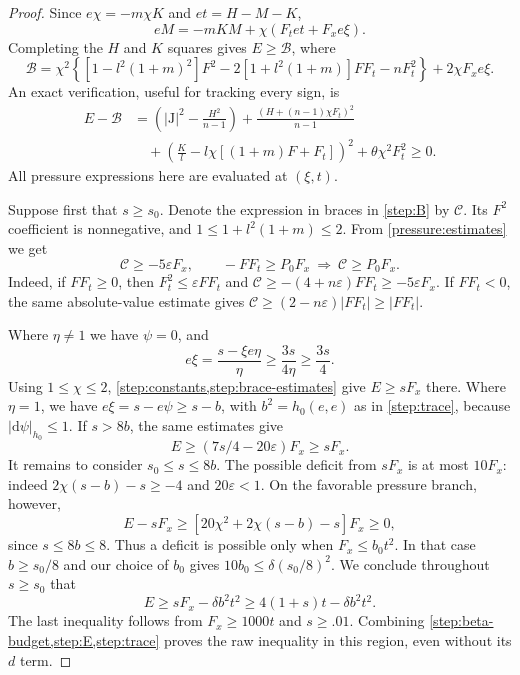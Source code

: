 \documentclass[11pt]{article}
\numberwithin{equation}{section}
\theoremstyle{definition}
\theoremstyle{remark}
\begin{document}
\begin{proof}
Since $e\chi=-m\chi K$ and $et=H-M-K$,
\[
 eM=-mKM+\chi(F_t et+F_xe\xi).
\]
Completing the $H$ and $K$ squares gives $E\ge\mathcal B$, where
\begin{equation}\label{step:B}
 \mathcal B=\chi^2\left\{
 [1-l^2(1+m)^2]F^2
 -2[1+l^2(1+m)]FF_t-nF_t^2\right\}
 +2\chi F_xe\xi.
\end{equation}
An exact verification, useful for tracking every sign, is
\begin{align*}
 E-\mathcal B
 &=\left(|\mathrm J|^2-\frac{H^2}{n-1}\right)
 +\frac{(H+(n-1)\chi F_t)^2}{n-1}\\
 &\quad+\left(\frac K l-l\chi[(1+m)F+F_t]\right)^2
 +\theta\chi^2F_t^2\ge0.
\end{align*}
All pressure expressions here are evaluated at $(\xi,t)$.

Suppose first that $s\ge s_0$.  Denote the expression in braces in
\cref{step:B} by $\mathcal C$.  Its $F^2$ coefficient is nonnegative,
and $1\le1+l^2(1+m)\le2$.  From \cref{pressure:estimates} we get
\begin{equation}\label{step:brace-estimates}
 \mathcal C\ge-5\varepsilon F_x,
 \qquad
 -FF_t\ge P_0F_x\ \Longrightarrow\ \mathcal C\ge P_0F_x.
\end{equation}
Indeed, if $FF_t\ge0$, then $F_t^2\le\varepsilon FF_t$ and
$\mathcal C\ge-(4+n\varepsilon)FF_t\ge-5\varepsilon F_x$.
If $FF_t<0$, the same absolute-value estimate gives
$\mathcal C\ge(2-n\varepsilon)|FF_t|\ge|FF_t|$.

Where $\eta\ne1$ we have $\psi=0$, and
\[
 e\xi=\frac{s-\xi e\eta}{\eta}\ge\frac{3s}{4\eta}\ge\frac{3s}4.
\]
Using $1\le\chi\le2$, \cref{step:constants,step:brace-estimates}
give $E\ge sF_x$ there.  Where $\eta=1$, we have
$e\xi=s-e\psi\ge s-b$, with $b^2=h_0(e,e)$ as in \cref{step:trace},
because $|\mathrm d\psi|_{h_0}\le1$.
If $s>8b$, the same estimates give
\[
 E\ge(7s/4-20\varepsilon)F_x\ge sF_x.
\]
It remains to consider $s_0\le s\le8b$.  The possible deficit from
$sF_x$ is at most $10F_x$: indeed
$2\chi(s-b)-s\ge-4$ and $20\varepsilon<1$.
On the favorable pressure branch, however,
\[
 E-sF_x\ge[20\chi^2+2\chi(s-b)-s]F_x\ge0,
\]
since $s\le8b\le8$.  Thus a deficit is possible only when
$F_x\le b_0t^2$.  In that case $b\ge s_0/8$ and our choice of $b_0$
gives $10b_0\le\delta(s_0/8)^2$.  We conclude throughout $s\ge s_0$
that
\begin{equation}\label{step:large-slope}
 E\ge sF_x-\delta b^2t^2
 \ge4(1+s)t-\delta b^2t^2.
\end{equation}
The last inequality follows from $F_x\ge1000t$ and $s\ge.01$.
Combining \cref{step:beta-budget,step:E,step:trace} proves the raw
inequality in this region, even without its $d$ term.


\end{proof}
\end{document}
